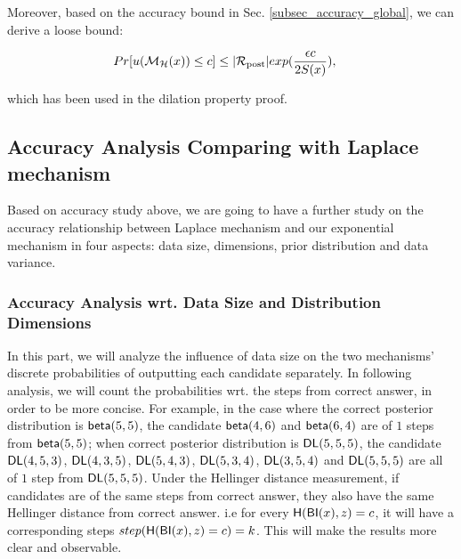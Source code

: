 \documentclass[sigconf]{acmart}
\begin{document}
Moreover, based on the accuracy bound in Sec. \ref{subsec_accuracy_global}, we can derive a loose bound:

\begin{equation*}
\begin{split}
Pr[u(\mathcal{M}_{\mathcal{H}}(x)) \leq c] 
& \leq |\mathcal{R}_{\textup{post}}|exp(\frac{\epsilon c}{2 S(x)}),
\end{split}
\end{equation*}

which has been used in the dilation property proof.


\subsection{Accuracy Analysis Comparing with Laplace mechanism}
\label{subsec_accuracy_tradeoff}
Based on accuracy study above, we are going to have a further study on the accuracy relationship between Laplace mechanism and our exponential mechanism in four aspects: data size, dimensions, prior distribution and data variance.

\subsubsection{Accuracy Analysis wrt. Data Size and Distribution Dimensions}
In this part, we will analyze the influence of data size on the two mechanisms' discrete probabilities of outputting each candidate separately. In following analysis, we will count the probabilities wrt. the steps from correct answer, in order to be more concise. For example, in the case where the correct posterior distribution is $\mathsf{beta}(5,5)$, the candidate $\mathsf{beta}(4,6)$ and $\mathsf{beta}(6,4)$ are of $1$ steps from $\mathsf{beta}(5,5)$; when correct posterior distribution is $\mathsf{DL}(5,5,5)$, the candidate $\mathsf{DL}(4,5,3)$, $\mathsf{DL}(4,3,5)$, $\mathsf{DL}(5,4,3)$, $\mathsf{DL}(5,3,4)$, $\mathsf{DL}(3,5,4)$ and $\mathsf{DL}(5,5,5)$ are all of $1$ step from $\mathsf{DL}(5,5,5)$. Under the Hellinger distance measurement, if candidates are of the same steps from correct answer, they also have the same Hellinger distance from correct answer. i.e for every $\mathsf{H}(\mathsf{BI}(x), z) = c$, it will have a corresponding steps $step(\mathsf{H}(\mathsf{BI}(x), z) = c) = k$. This will make the results more clear and observable.
\end{document}
